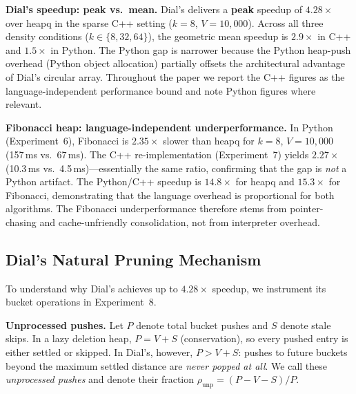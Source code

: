 \documentclass[conference]{IEEEtran}
\begin{document}
\noindent\textbf{Dial's speedup: peak vs.\ mean.}
Dial's delivers a \textbf{peak} speedup of $4.28\times$ over heapq in the
sparse C++ setting ($k=8$, $V=10{,}000$).  Across all three density
conditions ($k\in\{8,32,64\}$), the geometric mean speedup is
$\mathbf{2.9\times}$ in C++ and $\mathbf{1.5\times}$ in Python.  The
Python gap is narrower because the Python heap-push overhead (Python
object allocation) partially offsets the architectural advantage of Dial's
circular array.  Throughout the paper we report the C++ figures as the
language-independent performance bound and note Python figures where
relevant.

\noindent\textbf{Fibonacci heap: language-independent underperformance.}
In Python (Experiment~6), Fibonacci is $2.35\times$ slower than heapq for
$k=8$, $V=10{,}000$ (157\,ms vs.\ 67\,ms).  The C++ re-implementation
(Experiment~7) yields $2.27\times$ (10.3\,ms vs.\ 4.5\,ms)---essentially
the same ratio, confirming that the gap is \emph{not} a Python artifact.
The Python/C++ speedup is $14.8\times$ for heapq and $15.3\times$ for
Fibonacci, demonstrating that the language overhead is proportional for
both algorithms.  The Fibonacci underperformance therefore stems from
pointer-chasing and cache-unfriendly consolidation, not from interpreter
overhead.

\subsection{Dial's Natural Pruning Mechanism}
\label{sec:pruning}

To understand why Dial's achieves up to $4.28\times$ speedup, we
instrument its bucket operations in Experiment~8.

\noindent\textbf{Unprocessed pushes.}
Let $P$ denote total bucket pushes and $S$ denote stale skips.  In a
lazy deletion heap, $P = V + S$ (conservation), so every pushed entry
is either settled or skipped.  In Dial's, however, $P > V + S$: pushes
to future buckets beyond the maximum settled distance are \emph{never
popped at all}.  We call these \emph{unprocessed pushes} and denote
their fraction $\rho_{\mathrm{unp}} = (P - V - S)/P$.
\end{document}
